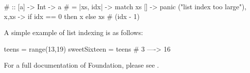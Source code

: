 \begin{kite}
{#} :: [a] -> Int -> a
{#} = |xs, idx| -> {
  match xs {
    [] -> panic ("list index too large"),
    x,xs -> if idx == 0 then x else xs # (idx - 1)
  }
}
\end{kite}

A simple example of list indexing is as follows:

\begin{kite}
teens = range(13,19)
sweetSixteen = teens # 3 ----> 16
\end{kite}

For a full documentation of Foundation, please see .
